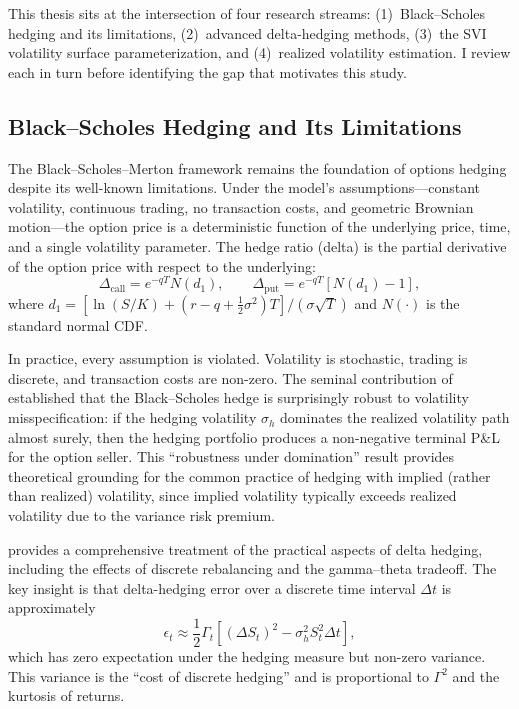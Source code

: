 \documentclass[12pt, letterpaper]{article}
\begin{document}
This thesis sits at the intersection of four research streams: (1)~Black--Scholes hedging and its limitations, (2)~advanced delta-hedging methods, (3)~the SVI volatility surface parameterization, and (4)~realized volatility estimation. I review each in turn before identifying the gap that motivates this study.

\subsection{Black--Scholes Hedging and Its Limitations}

The Black--Scholes--Merton framework \citep{Black1973, Merton1973} remains the foundation of options hedging despite its well-known limitations. Under the model's assumptions---constant volatility, continuous trading, no transaction costs, and geometric Brownian motion---the option price is a deterministic function of the underlying price, time, and a single volatility parameter. The hedge ratio (delta) is the partial derivative of the option price with respect to the underlying:
\begin{equation}
    \Delta_{\text{call}} = e^{-qT} N(d_1), \qquad \Delta_{\text{put}} = e^{-qT} [N(d_1) - 1],
    \label{eq:bsm_delta}
\end{equation}
where $d_1 = [\ln(S/K) + (r - q + \tfrac{1}{2}\sigma^2)T] / (\sigma\sqrt{T})$ and $N(\cdot)$ is the standard normal CDF.

In practice, every assumption is violated. Volatility is stochastic, trading is discrete, and transaction costs are non-zero. The seminal contribution of \citet{ElKaroui1998} established that the Black--Scholes hedge is surprisingly robust to volatility misspecification: if the hedging volatility $\sigma_h$ dominates the realized volatility path almost surely, then the hedging portfolio produces a non-negative terminal P\&L for the option seller. This ``robustness under domination'' result provides theoretical grounding for the common practice of hedging with implied (rather than realized) volatility, since implied volatility typically exceeds realized volatility due to the variance risk premium.

\citet{Hull2018} provides a comprehensive treatment of the practical aspects of delta hedging, including the effects of discrete rebalancing and the gamma--theta tradeoff. The key insight is that delta-hedging error over a discrete time interval $\Delta t$ is approximately
\begin{equation}
    \epsilon_t \approx \frac{1}{2}\Gamma_t \left[(\Delta S_t)^2 - \sigma_h^2 S_t^2 \Delta t\right],
    \label{eq:discrete_error}
\end{equation}
which has zero expectation under the hedging measure but non-zero variance. This variance is the ``cost of discrete hedging'' and is proportional to $\Gamma^2$ and the kurtosis of returns.
\end{document}
